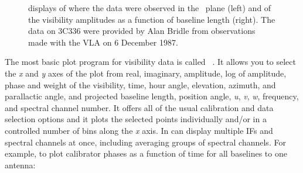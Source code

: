
\begin{figure}
\centering
\caption[{\tt UVPLT} displays]{{\tt {}} displays of where
the data were observed in the \uv\ plane (left) and of the visibility
amplitudes as a function of baseline length (right).  The data on
3C336 were provided by Alan Bridle from observations made with the VLA
on 6 December 1987.}
\label{fig:uvplt}
\end{figure}

     The most basic plot program for visibility data is called {\tt
{}}\@.  It allows you to select the {\it x\/} and {\it y\/}
axes of the plot from real, imaginary, amplitude, log of amplitude,
phase and weight of the visibility, time, hour angle, elevation,
azimuth, and parallactic angle, and projected baseline length,
position angle, {\it u\/}, {\it v\/}, {\it w\/}, frequency, and
spectral channel number.  It offers all of the usual calibration and
data selection options and it plots the selected points individually
and/or in a controlled number of bins along the {\it x\/} axis.  In
can display multiple IFs and spectral channels at once, including
averaging groups of spectral channels.  For example, to plot
calibrator phases as a function of time for all baselines to one
antenna:
\pd

